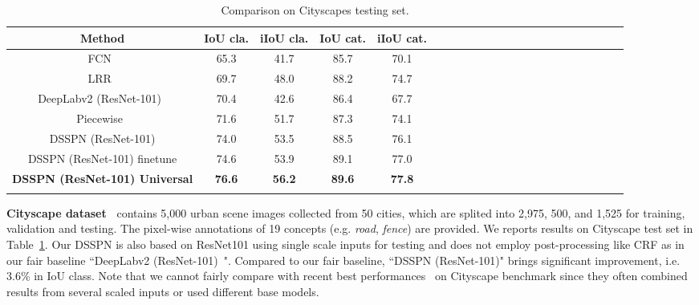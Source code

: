 \documentclass[10pt,twocolumn,letterpaper]{article}
\begin{document}
\begin{table}[!tp]\setlength{\tabcolsep}{2pt}
	\centering\footnotesize{\caption{ Comparison on Cityscapes testing set. }\label{tab:city}
	\begin{tabular}{cccccccccccccccccccccc}
		\toprule
		{Method} & IoU cla. &  iIoU cla. & IoU cat. & iIoU cat. \\
		\midrule
        FCN~\cite{long2015fully} & 65.3 & 41.7 & 85.7 & 70.1\\
        LRR~\cite{ghiasi2016laplacian} & 69.7 & 48.0 & 88.2 & 74.7\\
        DeepLabv2 (ResNet-101)~\cite{chen2016deeplab} & 70.4 & 42.6 & 86.4 & 67.7\\
		Piecewise~\cite{lin2016efficient}  & 71.6 & 51.7 & 87.3 & 74.1 \\
		\midrule
		{DSSPN (ResNet-101)} & {74.0} & {53.5} & {88.5} & {76.1}\\
		{DSSPN (ResNet-101) finetune} & {74.6} & {53.9} & {89.1} & {77.0}\\
		\textbf{DSSPN (ResNet-101) Universal} & \textbf{76.6} & \textbf{56.2} & \textbf{89.6} & \textbf{77.8}\\
		\hline
				\vspace{-5mm}
	\end{tabular}}
\end{table}\textbf{Cityscape dataset~\cite{cordts2015cityscapes}} contains 5,000 urban scene images collected from 50 cities, which are splited into 2,975, 500, and 1,525 for training, validation and testing. The pixel-wise annotations of 19 concepts (e.g. \emph{road}, \emph{fence}) are provided. We reports results on Cityscape test set in Table~\ref{tab:city}. Our DSSPN is also based on ResNet101 using single scale inputs for testing and does not employ post-processing like CRF as in our fair baseline ``DeepLabv2 (ResNet-101)~\cite{chen2016deeplab}". Compared to our fair baseline, ``DSSPN (ResNet-101)" brings significant improvement, i.e. 3.6\% in IoU class. Note that we cannot fairly compare with recent best performances~\cite{zhao2016pyramid,wu2016wider} on Cityscape benchmark since they often combined results from several scaled inputs or used different base models.
\end{document}
